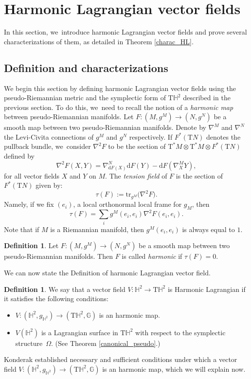 \documentclass[JEP,XML,SOM,Unicode,NoEqCountersInSection, NoFloatCountersInSection,published]{cedram}
\theoremstyle{plain}
\theoremstyle{definition}
\newtheorem{defi}[cor]{Definition}
\begin{document}
\section{Harmonic Lagrangian vector fields}\label{sec5_harmo}

In this section, we~introduce harmonic Lagrangian vector fields and prove several characterizations of them, as detailed in Theorem \ref{charac_HL}.

\subsection{Definition and characterizations}
We begin this section by defining harmonic Lagrangian vector fields using the pseudo-Riemannian metric and the symplectic form of $\mathrm{T}\mathbb{H}^2$ described in the previous section. To do this, we~need to recall the notion of a \emph{harmonic map} between pseudo-Riemannian manifolds.
Let $F:(M,g^M)\to(N,g^N)$ be a smooth map between two pseudo-Riemannian manifolds. Denote by $\nabla^{M}$ and $\nabla^{N}$ the Levi-Civita connections of $g^M$ and $g^N$ respectively. If $F^*(\mathrm{T}N)$
denotes the pullback bundle, we~consider $\nabla^2F$ to be the section of $\mathrm{T}^*M\otimes \mathrm{T}^*M\otimes F^*(\mathrm{T}N)$ defined by
\[
\nabla^2F(X,Y)=\nabla_{\mathrm{d}F(X)}^{N}\mathrm{d}F(Y)-\mathrm{d}F(\nabla^{M}_XY),
\]
for all vector fields $X$ and $Y$ on $M$.
The \emph{tension field} of $F$ is the section of $F^*(\mathrm{T}N)$ given by:
\[
\tau(F):=\mathrm{tr}_{g^{M}}\big(\nabla^2F \big).
\]
Namely, if we fix $(e_i)$, a local orthonormal local frame for $g_M$, then
\[
\tau(F)=\sum_{i}g^M(e_i,e_i)\nabla^2F(e_i,e_i).
\]
Note that if $M$ is a Riemannian manifold, then $g^{M}(e_i,e_i)$ is always equal to $1$.
\begin{defi}\label{harmonic_def}
Let $F:(M,g^M)\to(N,g^N)$ be a smooth map between two pseudo-Riemannian manifolds. Then $F$ is called \emph{harmonic} if $\tau(F)=0$.
\end{defi}
We can now state the Definition of harmonic Lagrangian vector field.
\begin{defi}\label{def1}
We say that a vector field $V:\mathbb{H}^2\to\mathrm{T}\mathbb{H}^2$ is Harmonic Lagrangian if it satisfies the following conditions:
\begin{itemize}
\item $V:(\mathbb{H}^2,g_{\mathbb{H}^2})\to(\mathrm{T}\mathbb{H}^2,\mathbb{G})$ is an harmonic map.
\item $V(\mathbb{H}^2)$ is a Lagrangian surface in $\mathrm{T}\mathbb{H}^2$ with respect to the symplectic structure~$\Omega$. (See Theorem \ref{canonical_pseudo}.)
\end{itemize}
\end{defi}
Konderak \cite{on_harmonic_vector_field} established necessary and sufficient conditions under which a vector field $V:(\mathbb{H}^2,g_{\mathbb{H}^2})\to(\mathrm{T}\mathbb{H}^2,\mathbb{G})$ is an harmonic map, which we will explain now.
\end{document}
